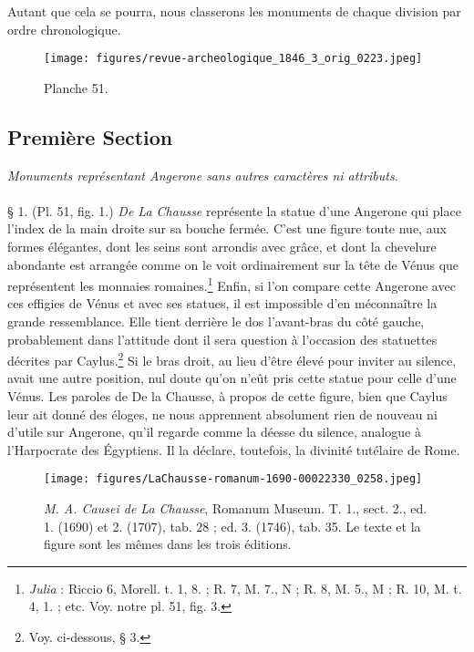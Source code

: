 \documentclass[a4paper, 11pt, oneside, polutonikogreek, french]{article}
\begin{document}
Autant que cela se pourra, nous classerons les monuments de chaque division par ordre chronologique.
\clearpage
\begin{landscape}
\vspace*{\fill}
\begin{figure}[H]
\centering
\texttt{[image: figures/revue-archeologique\_1846\_3\_orig\_0223.jpeg]}
\caption{Planche 51.}
\end{figure}
\vspace*{\fill}
\end{landscape}
\clearpage
\subsection{Première Section}
\begin{center}
\emph{Monuments représentant Angerone sans autres caractères ni attributs.}
\end{center}
\paragraph{}
§ 1. (Pl. 51, fig. 1.) \emph{De La Chausse} représente la statue d'une Angerone qui place l'index de la main droite sur sa bouche fermée. C'est une figure toute nue, aux formes élégantes, dont les seins sont arrondis avec grâce, et dont la chevelure abondante est arrangée comme on le voit ordinairement sur la tête de Vénus que représentent les monnaies romaines.\footnote{\emph{Julia} : Riccio 6, Morell. t. 1, 8. ; R. 7, M. 7., N ; R. 8, M. 5., M ; R. 10, M. t. 4, 1. ; etc. Voy. notre pl. 51, fig. 3.} Enfin, si l'on compare cette Angerone avec ces effigies de Vénus et avec ses statues, il est impossible d'en méconnaître la grande ressemblance. Elle tient derrière le dos l'avant-bras du côté gauche, probablement dans l'attitude dont il sera question à l'occasion des statuettes décrites par Caylus.\footnote{Voy. ci-dessous, § 3.} Si le bras droit, au lieu d'être élevé pour inviter au silence, avait une autre position, nul doute qu'on n'eût pris cette statue pour celle d'une Vénus. Les paroles de De la Chausse, à propos de cette figure, bien que Caylus leur ait donné des éloges, ne nous apprennent absolument rien de nouveau ni d'utile sur Angerone, qu'il regarde comme la déesse du silence, analogue à l'Harpocrate des Égyptiens. Il la déclare, toutefois, la divinité tutélaire de Rome.

\begin{figure}[H]
\centering
\texttt{[image: figures/LaChausse-romanum-1690-00022330\_0258.jpeg]}
\caption{\emph{M. A. Causei de La Chausse}, Romanum Museum. T. 1., sect. 2., ed. 1. (1690) et 2. (1707), tab. 28 ; ed. 3. (1746), tab. 35. Le texte et la figure sont les mêmes dans les trois éditions.}
\end{figure}
\end{document}
